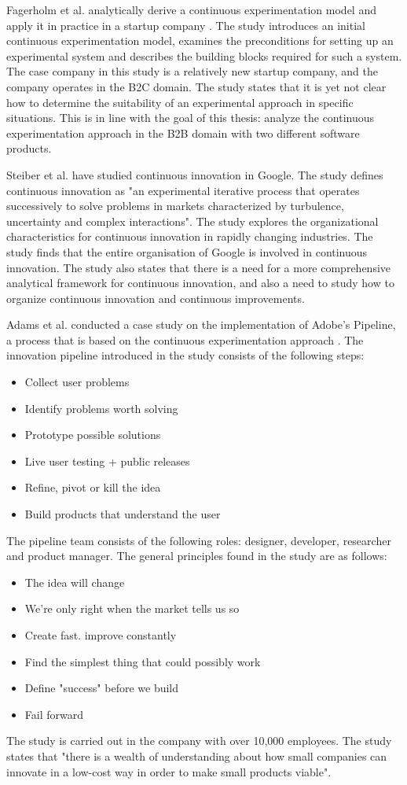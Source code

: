 \documentclass[english, grading]{tktltiki2}
\theoremstyle{definition}
\theoremstyle{remark}
\begin{document}
Fagerholm et al. analytically derive a continuous experimentation model and apply it in practice in a startup company \cite{fagerholm2014building}. The study introduces an initial continuous experimentation model, examines the preconditions for setting up an experimental system and describes the building blocks required for such a system. The case company in this study is a relatively new startup company, and the company operates in the B2C domain. The study states that it is yet not clear how to determine the suitability of an experimental approach in specific situations. This is in line with the goal of this thesis: analyze the continuous experimentation approach in the B2B domain with two different software products.

Steiber et al. \cite{steiber2013corporate} have studied continuous innovation in Google. The study defines continuous innovation as "an experimental iterative process that operates successively to solve problems in markets characterized by turbulence, uncertainty and complex interactions". The study explores the organizational characteristics for continuous innovation in rapidly changing industries. The study finds that the entire organisation of Google is involved in continuous innovation. The study also states that there is a need for a more comprehensive analytical framework for continuous innovation, and also a need to study how to organize continuous innovation and continuous improvements.   

Adams et al. conducted a case study on the implementation of Adobe's Pipeline, a process that is based on the continuous experimentation approach \cite{adams2013creating, adobe}. The innovation pipeline introduced in the study consists of the following steps:
\begin{itemize}
\item Collect user problems
\item Identify problems worth solving
\item Prototype possible solutions
\item Live user testing + public releases
\item Refine, pivot or kill the idea
\item Build products that understand the user
\end{itemize}
The pipeline team consists of the following roles: designer, developer, researcher and product manager. The general principles found in the study are as follows:
\begin{itemize}
\item The idea will change
\item We're only right when the market tells us so
\item Create fast. improve constantly
\item Find the simplest thing that could possibly work
\item Define "success" before we build
\item Fail forward
\end{itemize}
The study is carried out in the company with over 10,000 employees. The study states that "there is a wealth of understanding about how small companies can innovate in a low-cost way in order to make small products viable". 
\end{document}
